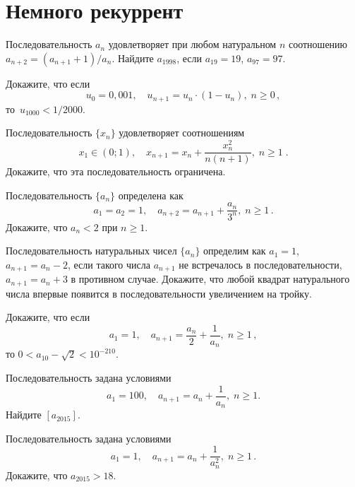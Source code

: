 
\section*{Немного рекуррент}


\begin{problems}

\item
Последовательность $a_n$ удовлетворяет при любом натуральном $n$ соотношению
$a_{n+2} = (a_{n+1} + 1) / a_n$.
Найдите $a_{1998}$, если $a_{19} = 19$, $a_{97} = 97$.

\item
Докажите, что если
\[
    u_0 = 0{,}001
,\quad
    u_{n+1} = u_n \cdot (1 - u_n)
        ,\; n \geq 0
\, , \]
то~$u_{1000} < 1 / 2000$.

\item
Последовательность $\{ x_n \}$ удовлетворяет соотношениям
\[
    x_1 \in (0; 1)
,\quad
    x_{n+1} = x_n + \frac{x_n^2}{n (n+1)}
        ,\; n \geq 1
\; . \]
Докажите, что эта последовательность ограничена.

\item
Последовательность $\{ a_n \}$ определена как
\[
    a_1 = a_2 = 1
,\quad
    a_{n+2} = a_{n+1} + \frac{a_n}{3^n}
        ,\; n \geq 1
\, . \]
Докажите, что $a_n < 2$ при $n \geq 1$.

\item
Последовательность натуральных чисел $\{ a_n \}$ определим как
$a_1 = 1$, $a_{n+1} = a_n - 2$, если такого числа $a_{n+1}$ не встречалось
в последовательности, $a_{n+1} = a_n + 3$ в противном случае.
Докажите, что любой квадрат натурального числа впервые появится
в последовательности увеличением на тройку.

\item
Докажите, что если
\[
    a_1 = 1
,\quad
    a_{n+1} = \frac{a_n}{2} + \frac{1}{a_n}
        ,\; n \geq 1
\, , \]
то $0 < a_{10} - \sqrt{2} < 10^{-210}$.

\item
Последовательность задана условиями
\[
    a_1 = 100
,\quad
    a_{n+1} = a_n + \frac{1}{a_n}
        ,\; n \geq 1
.\]
Найдите $[a_{2015}]$.

\item
Последовательность задана условиями
\[
    a_1 = 1
,\quad
    a_{n+1} = a_n + \frac{1}{a_n^2}
        ,\; n \geq 1
\, . \]
Докажите, что $a_{2015} > 18$.


\end{problems}
